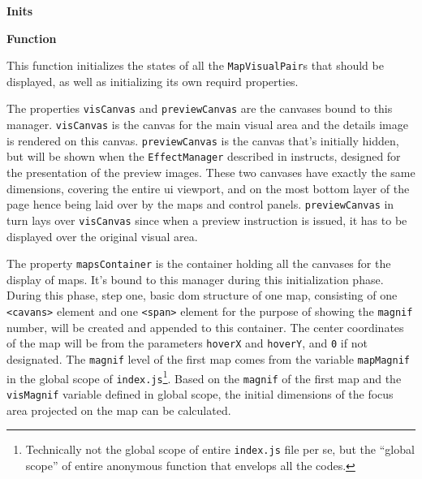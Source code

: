 \textbf{Inits}

\textbf{Function} 

This function initializes the states of all the \texttt{MapVisualPair}s that should be displayed, as well as initializing its own requird properties.

The properties \texttt{visCanvas} and \texttt{previewCanvas} are the canvases bound to this manager. \texttt{visCanvas} is the canvas for the main visual area and the details image is rendered on this canvas. \texttt{previewCanvas} is the canvas that's initially hidden, but will be shown when the \texttt{EffectManager} described in  instructs, designed for the presentation of the preview images. These two canvases have exactly the same dimensions, covering the entire \gls{ui} viewport, and on the most bottom layer of the page hence being laid over by the \glspl{map} and control panels. \texttt{previewCanvas} in turn lays over \texttt{visCanvas} since when a preview instruction is issued, it has to be displayed over the original visual area.

The property \texttt{mapsContainer} is the container holding all the canvases for the display of \glspl{map}. It's bound to this manager during this initialization phase. During this phase, step one, basic \gls{dom} structure of one \gls{map}, consisting of one \texttt{<cavans>} element and one \texttt{<span>} element for the purpose of showing the \texttt{magnif} number, will be created and appended to this container. The center coordinates of the \gls{map} will be from the parameters \texttt{hoverX} and \texttt{hoverY}, and \texttt{0} if not designated. The \texttt{magnif} level of the first \gls{map} comes from the variable \texttt{mapMagnif} in the global scope of \texttt{index.js}\footnote{ Technically not the global scope of entire \texttt{index.js} file per se, but the ``global scope'' of entire anonymous function that envelops all the codes.}. Based on the \texttt{magnif} of the first \gls{map} and the \texttt{visMagnif} variable defined in global scope, the initial dimensions of the focus area projected on the \gls{map} can be calculated.

